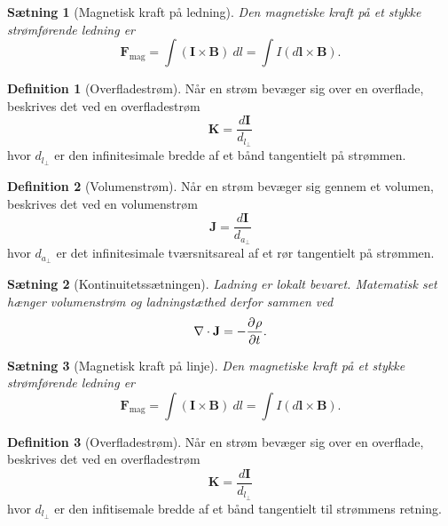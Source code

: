 \documentclass[]{article}
\newtheorem{theorem}{Sætning}
\theoremstyle{definition}
\newtheorem{definition}{Definition}
\begin{document}
\begin{theorem}[Magnetisk kraft på ledning]
	Den magnetiske kraft på et stykke strømførende ledning er
	\begin{equation*}
		\mathbf{F}_\text{mag} = \int(\mathbf{I} \times \mathbf{B}) \ dl = \int I (d\mathbf{l} \times \mathbf{B}).
	\end{equation*}
\end{theorem}

\begin{definition}[Overfladestrøm]
	Når en strøm bevæger sig over en overflade, beskrives det ved en overfladestrøm
	\begin{equation*}
		\mathbf{K} = \dfrac{d\mathbf{I}}{d_{l_\perp}}
	\end{equation*}
	hvor $d_{l_\perp}$ er den infinitesimale bredde af et bånd tangentielt på strømmen.
\end{definition}

\begin{definition}[Volumenstrøm]
	Når en strøm bevæger sig gennem et volumen, beskrives det ved en volumenstrøm
	\begin{equation*}
		\mathbf{J} = \dfrac{d\mathbf{I}}{d_{a_\perp}}
	\end{equation*}
	hvor $d_{a_\perp}$ er det infinitesimale tværsnitsareal af et rør tangentielt på strømmen.
\end{definition}

\begin{theorem}[Kontinuitetssætningen]
	Ladning er lokalt bevaret. Matematisk set hænger volumenstrøm og ladningstæthed derfor sammen ved
	\begin{equation*}
		\nabla \cdot \mathbf{J} = -\frac{\partial^{} \rho}{\partial t ^{}}.
	\end{equation*}
\end{theorem}

\begin{theorem}[Magnetisk kraft på linje]
	Den magnetiske kraft på et stykke strømførende ledning er
	\begin{equation*}
		\mathbf{F}_\text{mag} = \int(\mathbf{I} \times \mathbf{B}) \ dl = \int I (d\mathbf{l} \times \mathbf{B}).
	\end{equation*}
\end{theorem}

\begin{definition}[Overfladestrøm]
	Når en strøm bevæger sig over en overflade, beskrives det ved en overfladestrøm
	\begin{equation*}
		\mathbf{K} = \dfrac{d\mathbf{I}}{d_{l_\perp}}
	\end{equation*}
	hvor $d_{l_\perp}$ er den infitisemale bredde af et bånd tangentielt til strømmens retning.
\end{definition}
\end{document}

